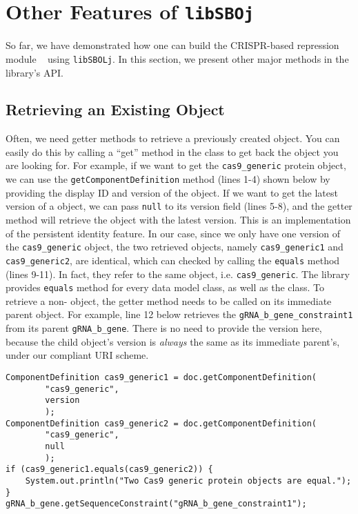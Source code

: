\section*{Other Features of {\tt libSBOj}}
So far, we have demonstrated how one can build the CRISPR-based repression module ~\cite{kiani2014crispr} using {\tt libSBOLj}. In this section, we present other major methods in the library's API. 

\subsection*{Retrieving an Existing Object}
Often, we need getter methods to retrieve a previously created object. You can easily do this by calling a ``get'' method in the  class to get back the  object you are looking for. For example, if we want to get the \lstinline+cas9_generic+ protein  object, we can use the \lstinline+getComponentDefinition+ method (lines 1-4) shown below by providing the display ID and version of the object. If we want to get the latest version of a  object, we can pass \lstinline+null+ to its version field (lines 5-8), and the getter method will retrieve the object with the latest version. This is an implementation of the persistent identity feature. In our case, since we only have one version of the \lstinline+cas9_generic+ object, the two retrieved objects, namely \lstinline+cas9_generic1+ and \lstinline+cas9_generic2+, are identical, which can checked by calling the \lstinline+equals+ method (lines 9-11). In fact, they refer to the same object, i.e. \lstinline+cas9_generic+. The library provides \lstinline+equals+  method for every data model class, as well as the  class. To retrieve a non- object, the getter method needs to be called on its immediate parent object. For example, line 12 below retrieves the \lstinline+gRNA_b_gene_constraint1+ from its parent  \lstinline+gRNA_b_gene+. There is no need to provide the version here, because the child object's version is \emph{always} the same as its immediate parent's, under our compliant URI scheme.

\vspace{\abovedisplayskip}
\begin{minipage}{0.95\textwidth} 
\begin{lstlisting}
ComponentDefinition cas9_generic1 = doc.getComponentDefinition(
        "cas9_generic", 
        version
        );
ComponentDefinition cas9_generic2 = doc.getComponentDefinition(
        "cas9_generic", 
        null
        );
if (cas9_generic1.equals(cas9_generic2)) {
    System.out.println("Two Cas9 generic protein objects are equal.");
}
gRNA_b_gene.getSequenceConstraint("gRNA_b_gene_constraint1");
\end{lstlisting}
\end{minipage}

